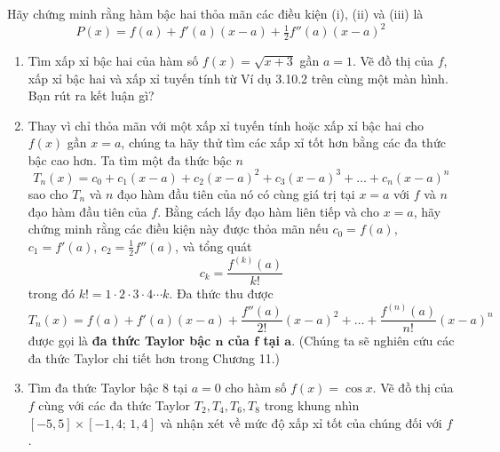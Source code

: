 \thispagestyle{fancy}

\begin{tcolorbox}[
    enhanced,
    colback=projectbg,
    colframe=projectbg,
    arc=0mm,
    boxrule=0pt,
    left=0pt,
    right=0pt,
    top=8pt,
    bottom=10pt,
    boxsep=0pt
]
\noindent
\begin{minipage}[t]{120pt}
    \null %
\end{minipage}%
\hspace{16pt}%
\begin{minipage}[t]{368pt}
    \setlength{\abovedisplayskip}{3pt}
    \setlength{\belowdisplayskip}{3pt}
    \fontsize{9.5}{13.5}\selectfont
    \noindent Hãy chứng minh rằng hàm bậc hai thỏa mãn các điều kiện (i), (ii) và (iii) là
    \[
    P(x) = f(a) + f'(a)(x - a) + \tfrac{1}{2} f''(a)(x - a)^2
    \]

    \begin{enumerate}[label=\textbf{\arabic*.}, leftmargin=1.4em, itemsep=5pt, topsep=3pt, parsep=0pt, start=4]
        \item Tìm xấp xỉ bậc hai của hàm số $f(x) = \sqrt{x + 3}$ gần $a = 1$. Vẽ đồ thị của $f$, xấp xỉ bậc hai và xấp xỉ tuyến tính từ Ví dụ 3.10.2 trên cùng một màn hình. Bạn rút ra kết luận gì?

        \item Thay vì chỉ thỏa mãn với một xấp xỉ tuyến tính hoặc xấp xỉ bậc hai cho $f(x)$ gần $x = a$, chúng ta hãy thử tìm các xấp xỉ tốt hơn bằng các đa thức bậc cao hơn. Ta tìm một đa thức bậc $n$
        \[
        T_n(x) = c_0 + c_1(x - a) + c_2(x - a)^2 + c_3(x - a)^3 + \dots + c_n(x - a)^n
        \]
        sao cho $T_n$ và $n$ đạo hàm đầu tiên của nó có cùng giá trị tại $x = a$ với $f$ và $n$ đạo hàm đầu tiên của $f$. Bằng cách lấy đạo hàm liên tiếp và cho $x = a$, hãy chứng minh rằng các điều kiện này được thỏa mãn nếu $c_0 = f(a)$, $c_1 = f'(a)$, $c_2 = \tfrac{1}{2} f''(a)$, và tổng quát
        \[
        c_k = \frac{f^{(k)}(a)}{k!}
        \]
        trong đó $k! = 1 \cdot 2 \cdot 3 \cdot 4 \dotsm k$. Đa thức thu được
        \[
        T_n(x) = f(a) + f'(a)(x - a) + \frac{f''(a)}{2!}(x - a)^2 + \dots + \frac{f^{(n)}(a)}{n!}(x - a)^n
        \]
        được gọi là \textbf{đa thức Taylor bậc $\boldsymbol{n}$ của $\boldsymbol{f}$ tại $\boldsymbol{a}$}. (Chúng ta sẽ nghiên cứu các đa thức Taylor chi tiết hơn trong Chương 11.)

        \item Tìm đa thức Taylor bậc 8 tại $a = 0$ cho hàm số $f(x) = \cos x$. Vẽ đồ thị của $f$ cùng với các đa thức Taylor $T_2, T_4, T_6, T_8$ trong khung nhìn $[-5, 5] \times [-1{,}4;\, 1{,}4]$ và nhận xét về mức độ xấp xỉ tốt của chúng đối với $f$.
    \end{enumerate}
\end{minipage}
\end{tcolorbox}

